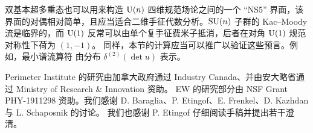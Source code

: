 双基本超多重态也可以用来构造 ${\mathrm U}(n)$ 四维规范场论之间的一个 “NS5” 界面，该界面的对偶相对简单，且应当适合二维手征代数分析。${\mathrm{SU}}(n)$ 子群的 Kac–Moody 流是临界的，而 ${\mathrm U}(1)$ 反常可以由单个复手征费米子抵消，后者在对角 ${\mathrm U}(1)$ 规范对称性下荷为 $(1,-1)$。 
同样，本节的计算应当可以推广以验证这些预言。例如，最小谱流算符
由分布 $\delta^{(2)}(\det u)$ 表示。 
%
% 
%

Perimeter Institute 的研究由加拿大政府通过 Industry Canada、并由安大略省通过 Ministry of Research $\&$ Innovation 资助。
EW 的研究部分由 NSF Grant PHY-1911298 资助。我们感谢 D. Baraglia、P. Etingof、E. Frenkel、D. Kazhdan 与 L. Schaposnik 的讨论。
我们也感谢 P. Etingof 仔细阅读手稿并提出若干澄清。
